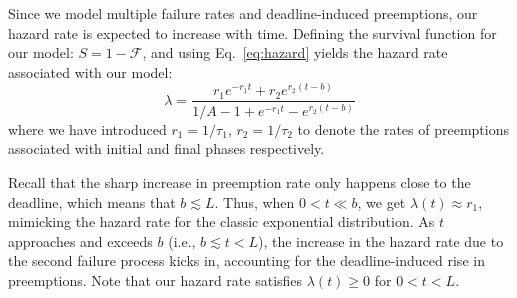 Since we model multiple failure rates and deadline-induced preemptions, our hazard rate is expected to increase with time. Defining the survival function for our model: $S = 1 - \mathscr{F}$, and using Eq.~\ref{eq:hazard} yields the hazard rate associated with our model: 
\noindent 
\begin{equation}
  \label{eq:hmodel}
  \lambda %
  = \dfrac{r_1 e^{- r_1 t} + r_2 e^{r_2 (t - b)}}{1/A - 1 + e^{- r_1 t} - e^{r_2 (t - b)}}
\end{equation}
where we have introduced $r_1 = 1/\tau_1$, $r_2 = 1/\tau_2$ to denote the rates of preemptions associated with initial and final phases respectively.




Recall that the sharp increase in preemption rate only happens close to the deadline, which means that $b \lesssim L$. Thus, when $0 < t \ll b$, we get $\lambda(t) \approx r_1$, mimicking the hazard rate for the classic exponential distribution.
As $t$ approaches and exceeds $b$ (i.e., $b\lesssim t < L$), the increase in the hazard rate due to the second failure process kicks in, accounting for the deadline-induced rise in preemptions. Note that our hazard rate satisfies $\lambda(t) \ge 0$ for $0<t<L$.

